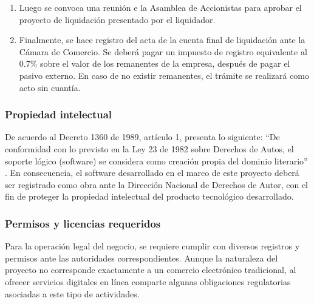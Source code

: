 \begin{enumerate}
\begin{itemize}
		\item Relación de los pasivos de la entidad.
		
		\item Estado de cuentas a la DIAN.
		
		\item Pago de pasivos.
		
		\item Indicación del remanente.
		
		\item Destinación del remanente.
	\end{itemize}
	
	\item Luego se convoca una reunión e la Asamblea de Accionistas para aprobar el proyecto de liquidación presentado por el liquidador.
	
	\item Finalmente, se hace registro del acta de la cuenta final de liquidación ante la Cámara de Comercio. Se deberá pagar un impuesto de registro equivalente al 0.7\% sobre el valor de los remanentes de la empresa, después de pagar el pasivo externo. En caso de no existir remanentes, el trámite se realizará como acto sin cuantía.
\end{enumerate}

{}
\subsubsection*{Propiedad intelectual}


De acuerdo al Decreto 1360 de 1989, artículo 1, presenta lo siguiente: ``De conformidad con lo previsto en la Ley 23 de 1982 sobre Derechos de Autos, el soporte lógico (software) se considera como creación propia del dominio literario'' \parencite{Ley1360}. En consecuencia, el software desarrollado en el marco de este proyecto deberá ser registrado como obra ante la Dirección Nacional de Derechos de Autor, con el fin de proteger la propiedad intelectual del producto tecnológico desarrollado.

{}
\subsubsection*{Permisos y licencias requeridos}


Para la operación legal del negocio, se requiere cumplir con diversos registros y permisos ante las autoridades correspondientes. Aunque la naturaleza del proyecto no corresponde exactamente a un comercio electrónico tradicional, al ofrecer servicios digitales en línea comparte algunas obligaciones regulatorias asociadas a este tipo de actividades.

